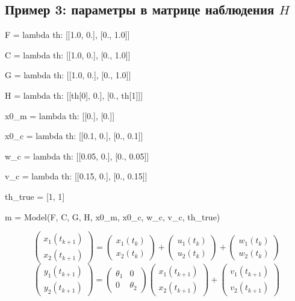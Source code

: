 \documentclass[a4paper,14pt]{extarticle}
\newcommand{\fut}[0]{t_{k+1}}
\begin{document}
\newpage
\subsection{Пример 3: параметры в матрице наблюдения $H$}

\begin{pycode}[model3]
F = lambda th: [[1.0, 0.],
                [0., 1.0]]

C = lambda th: [[1.0, 0.],
                [0., 1.0]]

G = lambda th: [[1.0, 0.],
                [0., 1.0]]

H = lambda th: [[th[0], 0.],
                [0., th[1]]]

x0_m = lambda th: [[0.],
                   [0.]]

x0_c = lambda th: [[0.1, 0.],
                   [0., 0.1]]

w_c = lambda th: [[0.05, 0.],
                  [0., 0.05]]

v_c = lambda th: [[0.15, 0.],
                  [0., 0.15]]

th_true = [1, 1]

m = Model(F, C, G, H, x0_m, x0_c, w_c, v_c, th_true)
\end{pycode}

\[
  \begin{pmatrix} x_1(\fut) \\ x_2(\fut) \end{pmatrix} =
  \begin{pmatrix} x_1(t_k) \\ x_2(t_k) \end{pmatrix} +
  \begin{pmatrix} u_1(t_k) \\ u_2(t_k) \end{pmatrix}
  + \begin{pmatrix} w_1(t_k) \\ w_2(t_k) \end{pmatrix}
\]
\[
  \begin{pmatrix} y_1(\fut) \\ y_2(\fut) \end{pmatrix} =
  \begin{pmatrix} \theta_1 & 0 \\ 0 & \theta_2 \end{pmatrix}
  \begin{pmatrix} x_1(\fut) \\ x_2(\fut) \end{pmatrix} +
  \begin{pmatrix} v_1(\fut) \\ v_2(\fut) \end{pmatrix}
\]
\end{document}
